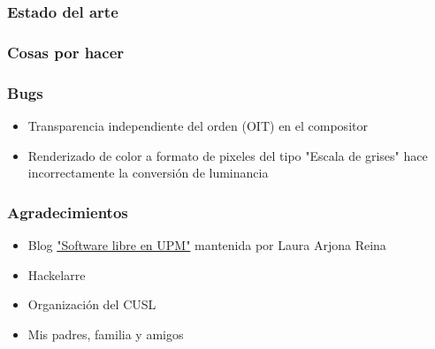 \documentclass{beamer}
\begin{document}
\begin{frame} \frametitle{Estado del arte}
\end{frame}

\begin{frame} \frametitle{Cosas por hacer}
\end{frame}

\begin{frame} \frametitle{Bugs}
	\begin{itemize}
		\item{Transparencia independiente del orden (OIT) en el compositor}
		\item{Renderizado de color a formato de pixeles del tipo "Escala de grises" hace incorrectamente la conversión de luminancia}
	\end{itemize}
\end{frame}

\begin{frame} \frametitle{Agradecimientos}
	\begin{itemize}
		\item{Blog \href{http://blogs.upm.es/softwarelibre/}{"Software libre en UPM"} mantenida por Laura Arjona Reina}
		\item{Hackelarre}
		\item{Organización del CUSL}
		\item{Mis padres, familia y amigos}
	\end{itemize}
\end{frame}

\end{document}
